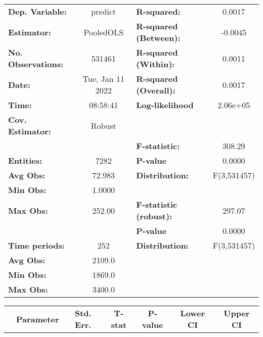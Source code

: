 \begin{center}
\begin{tabular}{lclc}
\toprule
\textbf{Dep. Variable:}    &      predict       & \textbf{  R-squared:         }   &      0.0017      \\
\textbf{Estimator:}        &     PooledOLS      & \textbf{  R-squared (Between):}  &     -0.0045      \\
\textbf{No. Observations:} &       531461       & \textbf{  R-squared (Within):}   &      0.0011      \\
\textbf{Date:}             &  Tue, Jan 11 2022  & \textbf{  R-squared (Overall):}  &      0.0017      \\
\textbf{Time:}             &      08:58:41      & \textbf{  Log-likelihood     }   &     2.06e+05     \\
\textbf{Cov. Estimator:}   &       Robust       & \textbf{                     }   &                  \\
\textbf{}                  &                    & \textbf{  F-statistic:       }   &      308.29      \\
\textbf{Entities:}         &        7282        & \textbf{  P-value            }   &      0.0000      \\
\textbf{Avg Obs:}          &       72.983       & \textbf{  Distribution:      }   &   F(3,531457)    \\
\textbf{Min Obs:}          &       1.0000       & \textbf{                     }   &                  \\
\textbf{Max Obs:}          &       252.00       & \textbf{  F-statistic (robust):} &      297.07      \\
\textbf{}                  &                    & \textbf{  P-value            }   &      0.0000      \\
\textbf{Time periods:}     &        252         & \textbf{  Distribution:      }   &   F(3,531457)    \\
\textbf{Avg Obs:}          &       2109.0       & \textbf{                     }   &                  \\
\textbf{Min Obs:}          &       1869.0       & \textbf{                     }   &                  \\
\textbf{Max Obs:}          &       3400.0       & \textbf{                     }   &                  \\
\bottomrule
\end{tabular}
\begin{tabular}{lcccccc}
                & \textbf{Parameter} & \textbf{Std. Err.} & \textbf{T-stat} & \textbf{P-value} & \textbf{Lower CI} & \textbf{Upper CI}  \\

\end{tabular}
\end{center}
